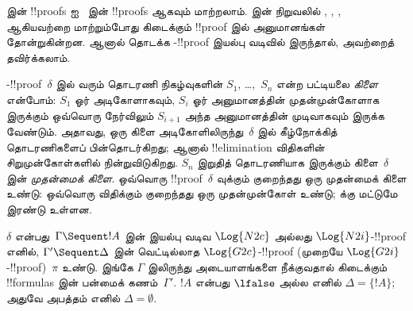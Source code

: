 \documentclass[../../../include/open-logic-section]{subfiles}
\begin{document}
 இன் !!{proof}s ஐ~
இன் !!{proof}s ஆகவும் மாற்றலாம்.
 இன்
நிறுவலில் \Elim{\land}, \Elim{\lif},
\Elim{\lnot}, \Elim{\lforall} ஆகியவற்றை
மாற்றும்போது கிடைக்கும்  !!{proof}
இல் \Cut{} அனுமானங்கள் தோன்றுகின்றன.
ஆனால் தொடக்க -!!{proof}
இயல்பு வடிவில் இருந்தால், அவற்றைத் தவிர்க்கலாம்.

-!!{proof}~$\delta$ இல் வரும்
தொடரணி நிகழ்வுகளின் $S_1$, \dots,~$S_n$
என்ற பட்டியலை \emph{கிளை} என்போம்:
$S_1$ ஓர் அடிகோளாகவும், $S_i$ ஓர்
அனுமானத்தின் முதன்முன்கோளாக இருக்கும்
ஒவ்வொரு நேர்விலும் $S_{i+1}$ அந்த
அனுமானத்தின் முடிவாகவும் இருக்க வேண்டும்.
அதாவது, ஒரு கிளை அடிகோளிலிருந்து~$\delta$
இல் கீழ்நோக்கித் தொடரணிகளைப் பின்தொடர்கிறது;
ஆனால் !!{elimination} விதிகளின்
சிறுமுன்கோள்களில் நின்றுவிடுகிறது.
$S_n$ இறுதித் தொடரணியாக இருக்கும் கிளை~$\delta$
இன் \emph{முதன்மைக் கிளை}. ஒவ்வொரு
!!{proof}~$\delta$ வுக்கும் குறைந்தது ஒரு
முதன்மைக் கிளை உண்டு: ஒவ்வொரு விதிக்கும்
குறைந்தது ஒரு முதன்முன்கோள் உண்டு;
\Intro{\land} க்கு மட்டுமே இரண்டு உள்ளன.

\begin{prop}
$\delta$ என்பது~$\Gamma \Sequent !A$ இன்
இயல்பு வடிவ $\Log{N2c}$ அல்லது
$\Log{N2i}$-!!{proof} எனில்,
$\Gamma' \Sequent \Delta$ இன் வெட்டில்லாத
$\Log{G2c}$-!!{proof} (முறையே
$\Log{G2i}$-!!{proof})~$\pi$ உண்டு.
இங்கே $\Gamma$ இலிருந்து அடையாளங்களை
நீக்குவதால் கிடைக்கும் !!{formula}s இன்
பன்மைக் கணம்~$\Gamma'$. $!A$ என்பது
$\lfalse$ அல்ல எனில் $\Delta=\{!A\}$;
அதுவே அபத்தம் எனில் $\Delta=\emptyset$.
\end{prop}
\end{document}
